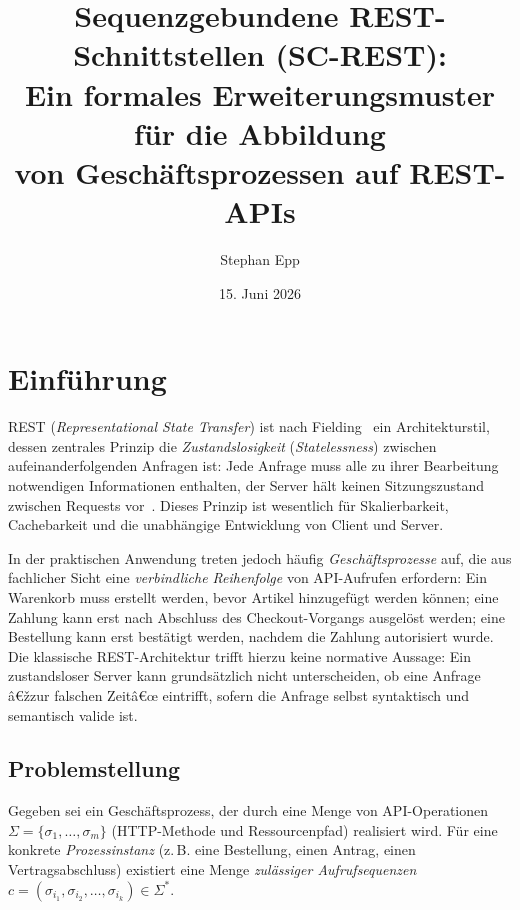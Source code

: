 ﻿\documentclass[a4paper,12pt]{article}
\title{Sequenzgebundene REST-Schnittstellen (SC-REST):\\
Ein formales Erweiterungsmuster für die Abbildung\\
von Geschäftsprozessen auf REST-APIs}
\author{Stephan Epp}
\date{15. Juni 2026}
\theoremstyle{definition}
\begin{document}
\maketitle

\tableofcontents
\newpage

\section{Einführung}

REST (\emph{Representational State Transfer}) ist nach Fielding~\cite{fielding2000} ein
Architekturstil, dessen zentrales Prinzip die \emph{Zustandslosigkeit} (\emph{Statelessness})
zwischen aufeinanderfolgenden Anfragen ist: Jede Anfrage muss alle zu ihrer Bearbeitung
notwendigen Informationen enthalten, der Server hält keinen Sitzungszustand zwischen
Requests vor~\cite{rfc7231}. Dieses Prinzip ist wesentlich für Skalierbarkeit, Cachebarkeit
und die unabhängige Entwicklung von Client und Server.

In der praktischen Anwendung treten jedoch häufig \emph{Geschäftsprozesse} auf, die aus
fachlicher Sicht eine \emph{verbindliche Reihenfolge} von API-Aufrufen erfordern: Ein
Warenkorb muss erstellt werden, bevor Artikel hinzugefügt werden können; eine Zahlung kann
erst nach Abschluss des Checkout-Vorgangs ausgelöst werden; eine Bestellung kann erst
bestätigt werden, nachdem die Zahlung autorisiert wurde. Die klassische REST-Architektur
trifft hierzu keine normative Aussage: Ein zustandsloser Server kann grundsätzlich nicht
unterscheiden, ob eine Anfrage â€žzur falschen Zeitâ€œ eintrifft, sofern die Anfrage selbst
syntaktisch und semantisch valide ist.

\subsection{Problemstellung}

Gegeben sei ein Geschäftsprozess, der durch eine Menge von API-Operationen
$\Sigma = \{\sigma_1, \ldots, \sigma_m\}$ (HTTP-Methode und Ressourcenpfad) realisiert wird.
Für eine konkrete \emph{Prozessinstanz} (z.\,B. eine Bestellung, einen Antrag, einen
Vertragsabschluss) existiert eine Menge \emph{zulässiger Aufrufsequenzen}
$c = (\sigma_{i_1}, \sigma_{i_2}, \ldots, \sigma_{i_k}) \in \Sigma^*$.
\end{document}
